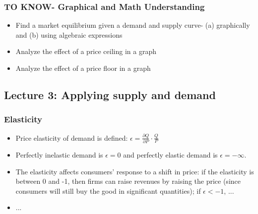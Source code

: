 \documentclass{article}
\begin{document}
\subsubsection{TO KNOW- Graphical and Math Understanding}
\begin{itemize}
\item Find a market equilibrium given a demand and supply curve- (a) graphically and (b) using algebraic expressions 
\item Analyze the effect of a price ceiling in a graph 
\item Analyze the effect of a price floor in a graph 
\end{itemize}

\subsection{Lecture 3: Applying supply and demand}
\subsubsection{Elasticity}

\begin{itemize}
\item Price elasticity of demand is defined: $\epsilon = \frac{\partial Q}{\partial P} \cdot \frac{Q}{P}$
\item Perfectly inelastic demand is $\epsilon = 0$ and perfectly elastic demand is $\epsilon = -\infty$.
\item The elasticity affects consumers' response to a shift in price: if the elasticity is between 0 and -1, then firms can raise revenues by raising the price (since consumers will still buy the good in significant quantities); if $\epsilon < -1$, ...
\item ...
\end{itemize}
\end{document}

